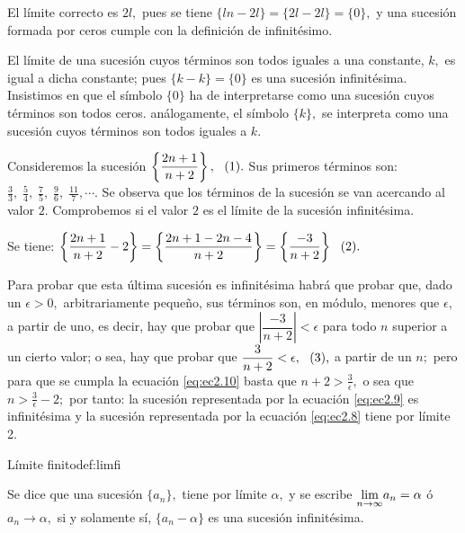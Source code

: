 \documentclass[oneside,english,spanish,2m,twoside,svgnames,x11names,HTML,twoside,12pt]{libro-matua}\usepackage[]{graphicx}\usepackage[]{color}
\newcommand{\val}[1]{\left|#1\right|}
\newcommand{\inline}{\refstepcounter{equation}~~\mbox{(\theequation)}}%
\begin{document}
El límite correcto es $2l,$ pues se tiene $\{ln-2l\}=\{2l-2l\}=\{0\},$
y una sucesión formada por ceros cumple con la definición de infinitésimo.\fin 

\general El límite de una sucesión cuyos términos son todos iguales
a una constante, $k,$ es igual a dicha constante; pues $\{k-k\}=\{0\}$
es una sucesión infinitésima. Insistimos en que el símbolo $\{0\}$
ha de interpretarse como una sucesión cuyos términos son todos ceros.
análogamente, el símbolo $\{k\},$ se interpreta como una sucesión
cuyos términos son todos iguales a $k.$

\begin{ejemplo}\label{ej:ejem8cv}

Consideremos la sucesión $\left\{ \dfrac{2n+1}{n+2}\right\} ,\text{\inline\text{\label{eq:ec2.8}.}}$
Sus primeros términos son: $\frac{3}{3},\;\frac{5}{4},\;\frac{7}{5},\;\frac{9}{6},\;\frac{11}{7},\cdots.$
Se observa que los términos de la sucesión se van acercando al valor
$2.$ Comprobemos si el valor $2$ es el límite de la sucesión infinitésima.

Se tiene: $\left\{ \dfrac{2n+1}{n+2}-2\right\} =\left\{ \dfrac{2n+1-2n-4}{n+2}\right\} =\left\{ \dfrac{-3}{n+2}\right\} \text{\inline\text{\label{eq:ec2.9}.}}$

Para probar que esta última sucesión es infinitésima habrá que probar
que, dado un $\epsilon>0,$ arbitrariamente pequeño, sus términos
son, en módulo, menores que $\epsilon,$ a partir de uno, es decir,
hay que probar que $\val{\dfrac{-3}{n+2}}<\epsilon$ para todo $n$
superior a un cierto valor; o sea, hay que probar que $\dfrac{3}{n+2}<\epsilon,\text{\inline\text{\label{eq:ec2.10},}}$
a partir de un $n;$ pero para que se cumpla la ecuación \ref{eq:ec2.10}
basta que $n+2>\frac{3}{\epsilon},$ o sea que $n>\frac{3}{\epsilon}-2;$
por tanto: la sucesión representada por la ecuación \ref{eq:ec2.9}
es infinitésima y la sucesión representada por la ecuación \ref{eq:ec2.8}
tiene por límite 2.

\end{ejemplo}

\begin{defi}{Límite finito}{def:limfi}

Se dice que una sucesión $\{a_{n}\},$ tiene por límite $\alpha,$
y se escribe $\Lim{a_n}{n}{\infty}=\alpha$ ó $a_{n}\to\alpha,$ si
y solamente sí, $\{a_{n}-\alpha\}$ es una sucesión infinitésima.

\end{defi}
\end{document}
